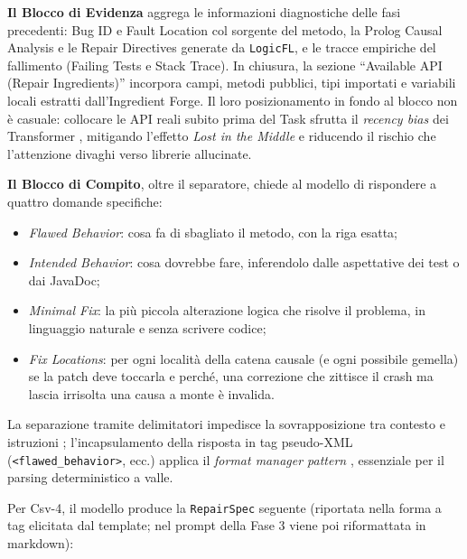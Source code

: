 \textbf{Il Blocco di Evidenza} aggrega le informazioni diagnostiche delle fasi precedenti: Bug ID e Fault
Location col sorgente del metodo, la Prolog Causal Analysis e le Repair Directives generate da \texttt{LogicFL},
e le tracce empiriche del fallimento (Failing Tests e Stack Trace). In chiusura, la sezione ``Available API
(Repair Ingredients)'' incorpora campi, metodi pubblici, tipi importati e variabili locali estratti
dall'Ingredient Forge. Il loro posizionamento in fondo al blocco non è casuale: collocare le API reali subito
prima del Task sfrutta il \textit{recency bias} dei Transformer \cite{zhao2021calibrate}, mitigando l'effetto
\textit{Lost in the Middle} \cite{liu2024lost} e riducendo il rischio che l'attenzione divaghi verso librerie allucinate.

\textbf{Il Blocco di Compito}, oltre il separatore, chiede al modello di rispondere a quattro domande specifiche:
\begin{itemize}
    \item \textit{Flawed Behavior}: cosa fa di sbagliato il metodo, con la riga esatta;
    \item \textit{Intended Behavior}: cosa dovrebbe fare, inferendolo dalle aspettative dei test o dai JavaDoc;
    \item \textit{Minimal Fix}: la più piccola alterazione logica che risolve il problema, in linguaggio naturale
    e senza scrivere codice;
    \item \textit{Fix Locations}: per ogni località della catena causale (e ogni possibile gemella) se la patch
    deve toccarla e perché, una correzione che zittisce il crash ma lascia irrisolta una causa a monte è invalida.
\end{itemize}
La separazione tramite delimitatori impedisce la sovrapposizione tra contesto e istruzioni \cite{white2023prompt};
l'incapsulamento della risposta in tag pseudo-XML (\texttt{<flawed\_behavior>}, ecc.) applica il \textit{format
manager pattern} \cite{white2023prompt}, essenziale per il parsing deterministico a valle.

Per Csv-4, il modello produce la \texttt{RepairSpec} seguente (riportata nella forma a tag elicitata dal template;
nel prompt della Fase 3 viene poi riformattata in markdown):

